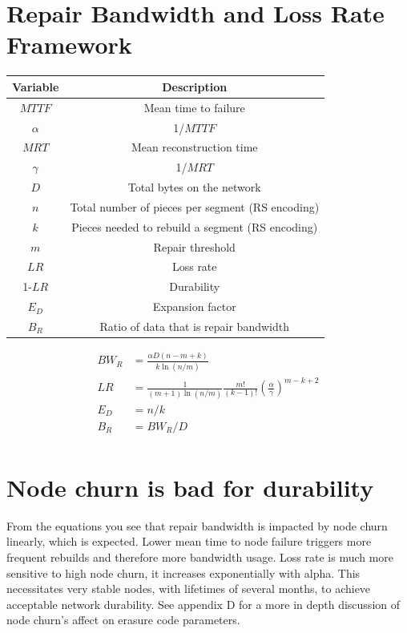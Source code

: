 \documentclass[11pt,fleqn,openany]{book}
\begin{document}
\section{Repair Bandwidth and Loss Rate Framework}
\begin{table}[h]
\centering

\begin{tabular}{| c | c |}\hline
Variable & Description\\\hline
$MTTF$ & Mean time to failure \\
$\alpha$ & 1/$MTTF$\\
$MRT$ & Mean reconstruction time \\
$\gamma$ & 1/$MRT$\\
$D$&Total bytes on the network\\
$n$ & Total number of pieces per segment (RS encoding)\\
$k$ & Pieces needed to rebuild a segment (RS encoding)\\
$m$ & Repair threshold\\
$LR$ & Loss rate\\
1-$LR$ & Durability\\
$E_D$ & Expansion factor\\
$B_R$ & Ratio of data that is repair bandwidth\\
\hline
\end{tabular}
\end{table}

\begin{align*}
BW_R&=\frac{\alpha D(n-m+k)}{k\ln(n/m)}\\
LR&=\frac{1}{(m+1)\ln(n/m)}\frac{m!}{(k-1)!}\left(\frac{\alpha}{\gamma}\right)^{m-k+2}\\
E_D&=n/k\\
B_R&=BW_R/D\\
\end{align*}

\section{Node churn is bad for durability}\label{appendix:bandwidth-space-limits}
	From the equations you see that repair bandwidth is impacted by node churn linearly, which is expected. Lower mean time to node failure triggers more frequent rebuilds and therefore more bandwidth usage. Loss rate is much more sensitive to high node churn, it increases exponentially with alpha. This necessitates very stable nodes, with lifetimes of several months, to achieve acceptable network durability. See appendix D for a more in depth discussion of node churn's affect on erasure code parameters.
\end{document}
